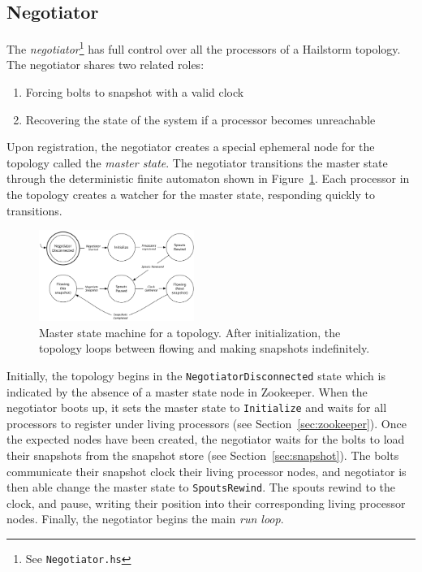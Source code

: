 \documentclass[10pt,nocopyrightspace]{sigplanconf}
\begin{document}
\subsection{Negotiator}
\label{sec:negotiator}

The \textit{negotiator}\footnote{See \texttt{Negotiator.hs}} has full control
over all the processors of a Hailstorm topology. The negotiator shares
two related roles:
\begin{enumerate}
  \item Forcing bolts to snapshot with a valid clock
  \item Recovering the state of the system if a processor
        becomes unreachable
\end{enumerate}

Upon registration, the negotiator creates a special ephemeral node for the
topology called the \textit{master state}. The negotiator transitions the master
state through the deterministic finite automaton shown in
Figure~\ref{fig:masterstate}. Each processor in the topology creates a
watcher for the master state, responding quickly to transitions.

\begin{figure}[h]
  \includegraphics[width=0.45\textwidth]{images/master_state.pdf}
  \caption{Master state machine for a topology. After initialization, the
  topology loops between flowing and making snapshots
  indefinitely.}\label{fig:masterstate}
\end{figure}

Initially, the topology begins in the \lstinline{NegotiatorDisconnected} state which
is indicated by the absence of a master state node in Zookeeper. When the
negotiator boots up, it sets the master state to \lstinline{Initialize} and waits
for all processors to register under living processors (see
Section~\ref{sec:zookeeper}). Once the expected nodes have been created, the
negotiator waits for the bolts to load their snapshots from the snapshot store
(see Section~\ref{sec:snapshot}). The bolts communicate their snapshot clock
their living processor nodes, and negotiator is then able change the master state to
\lstinline{SpoutsRewind}. The spouts rewind to the clock, and pause, writing their
position into their corresponding living processor nodes. Finally, the
negotiator begins the main \textit{run loop}.
\end{document}
